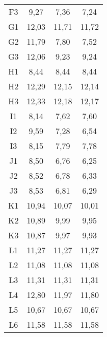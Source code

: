\begin{center}
\begin{longtable}{cccc}
    F3    & 9,27  & 7,36  & 7,24 \\
    G1    & 12,03 & 11,71 & 11,72 \\
    G2    & 11,79 & 7,80  & 7,52 \\
    G3    & 12,06 & 9,23  & 9,24 \\
    H1    & 8,44  & 8,44  & 8,44 \\
    H2    & 12,29 & 12,15 & 12,14 \\
    H3    & 12,33 & 12,18 & 12,17 \\
    I1    & 8,14  & 7,62  & 7,60 \\
    I2    & 9,59  & 7,28  & 6,54 \\
    I3    & 8,15  & 7,79  & 7,78 \\
    J1    & 8,50  & 6,76  & 6,25 \\
    J2    & 8,52  & 6,78  & 6,33 \\
    J3    & 8,53  & 6,81  & 6,29 \\
    K1    & 10,94 & 10,07 & 10,01 \\
    K2    & 10,89 & 9,99  & 9,95 \\
    K3    & 10,87 & 9,97  & 9,93 \\
    L1    & 11,27 & 11,27 & 11,27 \\
    L2    & 11,08 & 11,08 & 11,08 \\
    L3    & 11,31 & 11,31 & 11,31 \\
    L4    & 12,80 & 11,97 & 11,80 \\
    L5    & 10,67 & 10,67 & 10,67 \\
    L6    & 11,58 & 11,58 & 11,58 \\

\end{longtable}
\end{center}

